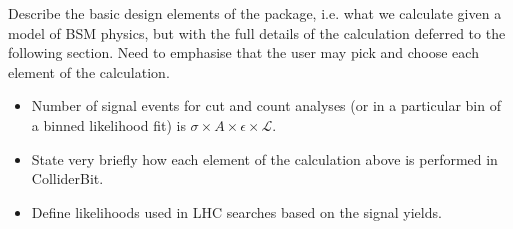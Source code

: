 Describe the basic design elements of the package, i.e. what we calculate given a model of BSM physics, but with the full details of the calculation deferred to the following section. Need to emphasise that the user may pick and choose each element of the calculation.

\begin{itemize}
\item Number of signal events for cut and count analyses (or in a particular bin of a binned likelihood fit) is $\sigma \times A \times \epsilon \times \mathcal{L}$.
\item State very briefly how each element of the calculation above is performed in ColliderBit.
\item Define likelihoods used in LHC searches based on the signal yields.
\end{itemize}
